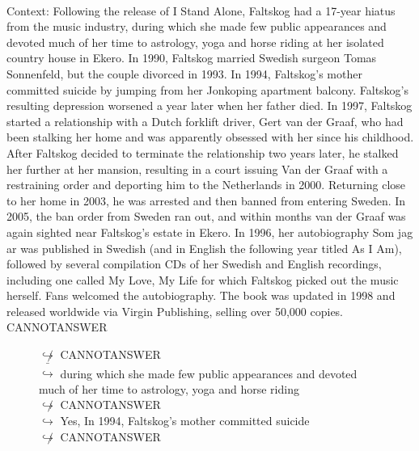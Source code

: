 \documentclass[11pt,a4paper, onecolumn]{article}
\begin{document}
\\ Context: Following the release of I Stand Alone, Faltskog had a 17-year hiatus from the music industry, during which she made few public appearances and devoted much of her time to astrology, yoga and horse riding at her isolated country house in Ekero. In 1990, Faltskog married Swedish surgeon Tomas Sonnenfeld, but the couple divorced in 1993. In 1994, Faltskog's mother committed suicide by jumping from her Jonkoping apartment balcony. Faltskog's resulting depression worsened a year later when her father died. In 1997, Faltskog started a relationship with a Dutch forklift driver, Gert van der Graaf, who had been stalking her home and was apparently obsessed with her since his childhood. After Faltskog decided to terminate the relationship two years later, he stalked her further at her mansion, resulting in a court issuing Van der Graaf with a restraining order and deporting him to the Netherlands in 2000. Returning close to her home in 2003, he was arrested and then banned from entering Sweden. In 2005, the ban order from Sweden ran out, and within months van der Graaf was again sighted near Faltskog's estate in Ekero. In 1996, her autobiography Som jag ar was published in Swedish (and in English the following year titled As I Am), followed by several compilation CDs of her Swedish and English recordings, including one called My Love, My Life for which Faltskog picked out the music herself. Fans welcomed the autobiography. The book was updated in 1998 and released worldwide via Virgin Publishing, selling over 50,000 copies. CANNOTANSWER

\begin{figure}[t] \small \begin{tcolorbox}[boxsep=0pt,left=5pt,right=0pt,top=2pt,colback = yellow!5] \begin{dialogue}
 \small 
\colorbox{pink!25}{$\not\hookrightarrow$}
{ CANNOTANSWER }
\\
\colorbox{pink!25}{ $\bar{\hookrightarrow}$}
{ during which she made few public appearances and devoted much of her time to astrology, yoga and horse riding }
\\
\colorbox{pink!25}{$\not\hookrightarrow$}
{ CANNOTANSWER }
\\
\colorbox{pink!25}{$\hookrightarrow$}
\colorbox{red!25}{Yes,}
{ In 1994, Faltskog's mother committed suicide }
\\
\colorbox{pink!25}{$\not\hookrightarrow$}
{ CANNOTANSWER }
\\
 \end{dialogue}\end{tcolorbox}\end{figure}
\end{document}
